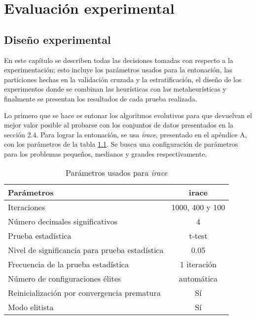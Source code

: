 \chapter{Evaluación experimental}
\label{capitulo3}

\section{Diseño experimental}

En este capítulo se describen todas las decisiones tomadas con respecto a la experimentación; esto incluye los parámetros usados para la entonación, las particiones hechas en la validación cruzada y la estratificación, el diseño de los experimentos donde se combinan las heurísticas con las metaheurísticas y finalmente se presentan los resultados de cada prueba realizada. 

Lo primero que se hace es entonar los algoritmos evolutivos para que devuelvan el mejor valor posible al probarse con los conjuntos de datos presentados en la sección 2.4. Para lograr la entonación, se usa \emph{irace}, presentado en el apéndice A, con los parámetros de la tabla \ref{irace-param}. Se busca una configuración de parámetros para los problemas pequeños, medianos y grandes respectivamente.

\begin{table}[]
\centering
\begin{tabular}{l c}
\hline
Parámetros & irace \\
\hline
\hline
Iteraciones                                 &  1000, 400 y 100\\
Número decimales significativos             &    4            \\
Prueba estadística                          &  t-test         \\
Nivel de significancia para prueba estadística  &  0.05           \\
Frecuencia de la prueba estadística         &    1 iteración  \\
Número de configuraciones élites            &  automática     \\
Reinicialización por convergencia prematura &     Sí          \\
Modo elitista                               &     Sí          \\

\hline
\end{tabular}
\caption{Parámetros usados para \emph{irace}}
\label{irace-param}
\end{table}

